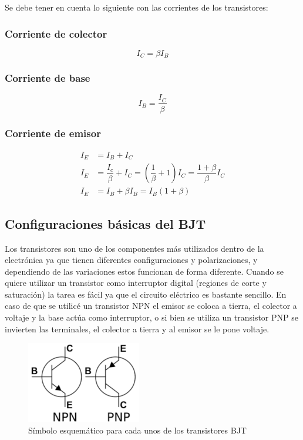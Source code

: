 Se debe tener en cuenta lo siguiente con las corrientes de los transistores:


\subsubsection{Corriente de colector}
\begin{equation}
    I_C=\beta I_B
    \label{eqn:ic}
\end{equation}
\subsubsection{Corriente de base}
\begin{equation}
    I_B=\dfrac{I_C}{\beta }
    \label{eqn:ib}
\end{equation}
\subsubsection{Corriente de emisor}
\begin{align}
    I_E & =I_B+I_C \label{eqn:ie}                                                                       \\[0.2cm]
    I_E & =\dfrac{I_c}{\beta}+I_C=(\dfrac{1}{\beta}+1)I_C =\dfrac{1+\beta}{\beta}I_C  \label{eqn:ie_ic} \\[0.2cm]
    I_E & = I_B+\beta I_B = I_B(1+\beta) \label{eqn:ie_ib}
\end{align}
\subsection{Configuraciones básicas del BJT}

Los transistores son uno de los componentes más utilizados dentro de la electrónica ya que tienen diferentes configuraciones y polarizaciones, y dependiendo de las variaciones estos funcionan de forma diferente. Cuando se quiere utilizar un transistor como interruptor digital (regiones de corte y saturación) la tarea es fácil ya que el circuito eléctrico es bastante sencillo. En caso de que se utilicé un transistor NPN el emisor se coloca a tierra, el colector a voltaje y la base actúa como interruptor, o si bien se utiliza un transistor PNP se invierten las terminales, el colector a tierra y al emisor se le pone voltaje.

\begin{figure}[H]
    \centering
    \includegraphics[width=5cm]{Imagenes/simbolo_bjt.png}
    \caption{Símbolo esquemático para cada unos de los transistores BJT}
    \label{fig:simbologia}
\end{figure}

